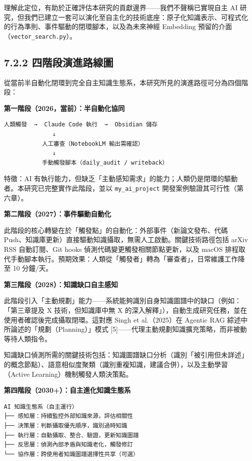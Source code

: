 理解此定位，有助於正確評估本研究的貢獻邊界------我們不聲稱已實現自主 AI
研究，但我們已建立一套可以演化至自主化的技術底座：原子化知識表示、可程式化的行為準則、事件驅動的閉環腳本，以及為未來神經
Embedding 預留的介面（\texttt{vector\_search.py}）。

\subsection{7.2.2
四階段演進路線圖}\label{ux56dbux968eux6bb5ux6f14ux9032ux8defux7ddaux5716}

從當前半自動化閉環到完全自主知識生態系，本研究所見的演進路徑可分為四個階段：

\textbf{第一階段（2026，當前）：半自動化協同}

\begin{verbatim}
人類觸發  →  Claude Code 執行  →  Obsidian 儲存
              ↓
           人工審查（NotebookLM 輸出需確認）
              ↓
           手動觸發腳本（daily_audit / writeback）
\end{verbatim}

特徵：AI
有執行能力，但缺乏「主動感知需求」的能力；人類仍是閉環的驅動者。本研究已完整實作此階段，並以
\texttt{my\_ai\_project} 開發案例驗證其可行性（第六章）。

\textbf{第二階段（2027）：事件驅動自動化}

此階段的核心轉變在於「觸發點」的自動化：外部事件（新論文發布、代碼
Push、知識庫更新）直接驅動知識攝取，無需人工啟動。關鍵技術路徑包括 arXiv
RSS 自動訂閱、Git hooks 偵測代碼變更觸發相關節點更新，以及 macOS
排程取代手動腳本執行。預期效果：人類從「觸發者」轉為「審查者」，日常維護工作降至
10 分鐘/天。

\textbf{第三階段（2028）：知識缺口自主感知}

此階段引入「主動規劃」能力------系統能夠識別自身知識圖譜中的缺口（例如：「第三章提及
X 技術，但知識庫中無 X
的深入解釋」），自動生成研究任務，並在使用者確認後完成攝取閉環。這對應
Singh et al.（2025）在 Agentic RAG
綜述中所論述的「規劃（Planning）」模式
{[}5{]}------代理主動規劃知識擴充策略，而非被動等待人類指令。

知識缺口偵測所需的關鍵技術包括：知識圖譜缺口分析（識別「被引用但未詳述」的概念節點）、語意相似度聚類（識別重複知識，建議合併），以及主動學習（Active
Learning）機制觸發人類決策點。

\textbf{第四階段（2030+）：自主進化知識生態系}

\begin{verbatim}
AI 知識生態系（自主運行）
├── 感知層：持續監控外部知識來源，評估相關性
├── 決策層：判斷攝取優先順序，識別過時知識
├── 執行層：自動攝取、整合、驗證，更新知識圖譜
├── 反思層：偵測內部矛盾與知識老化，觸發修訂
└── 協作層：跨使用者知識圖譜選擇性共享（可選）
\end{verbatim}

